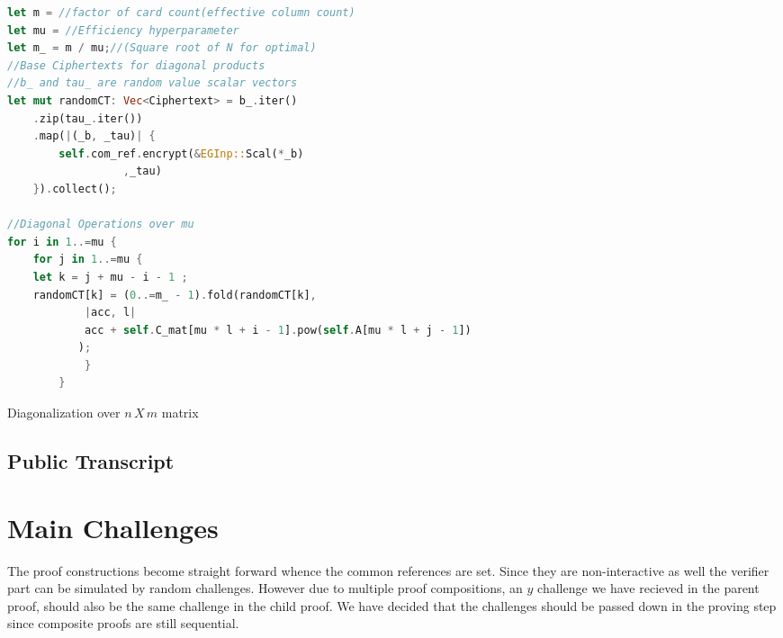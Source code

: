 \documentclass[12pt,a4paper]{report}
\begin{document}
\begin{table}
\begin{lstlisting}[language=Rust]
let m = //factor of card count(effective column count)
let mu = //Efficiency hyperparameter
let m_ = m / mu;//(Square root of N for optimal)
//Base Ciphertexts for diagonal products
//b_ and tau_ are random value scalar vectors
let mut randomCT: Vec<Ciphertext> = b_.iter()
	.zip(tau_.iter())
	.map(|(_b, _tau)| {
	    self.com_ref.encrypt(&EGInp::Scal(*_b) 
				  ,_tau)
	}).collect();

//Diagonal Operations over mu
for i in 1..=mu {
    for j in 1..=mu {
	let k = j + mu - i - 1 ;
	randomCT[k] = (0..=m_ - 1).fold(randomCT[k],
		    |acc, l|
			acc + self.C_mat[mu * l + i - 1].pow(self.A[mu * l + j - 1])
		   );
            }
        }
\end{lstlisting}
\caption{Diagonalization over $n\,X\,m$ matrix}
\label{table:diagon}
\end{table}
\subsection*{Public Transcript}

\section{Main Challenges}
The proof constructions become straight forward whence the common references are set. 
Since they are non-interactive as well the verifier part can be simulated by random challenges.
However due to multiple proof compositions, an $y$ challenge we have recieved in the parent proof,
should also be the same challenge in the child proof. We have decided that the challenges should be passed down in the proving step since composite proofs are still sequential.
\end{document}
